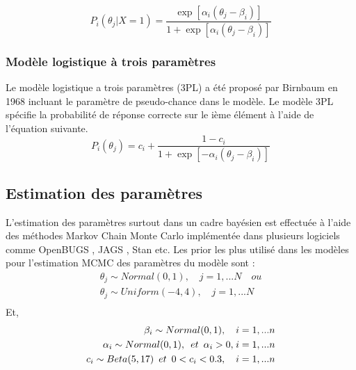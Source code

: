\begin{equation}
    P_{i}(\theta_{j} | X=1) = \frac{\exp \left[ \alpha_{i}(\theta_{j}-\beta_{i}) \right]  }{1+ \exp \left[ \alpha_{i}(\theta_{j}-\beta_{i}) \right]  } 
	\label{2pl_model_equation}
\end{equation}

\subsubsection{Modèle logistique à trois paramètres}
Le modèle logistique a trois paramètres (3PL) a été proposé par Birnbaum en 1968 incluant le paramètre de pseudo-chance dans le modèle. Le modèle 3PL spécifie la probabilité de réponse correcte sur le ième élément à l'aide de l'équation suivante. \\

\begin{equation}
    P_{i}(\theta_{j}) = c_{i} +  \frac{1 - c_{i}}{1+ \exp \left[ -\alpha_{i}(\theta_{j}-\beta_{i}) \right]  } 
	\label{3pl_model_equation}
\end{equation}

\subsection{Estimation des paramètres}
L'estimation des paramètres surtout dans un cadre bayésien est effectuée à l’aide des méthodes Markov Chain Monte Carlo implémentée dans plusieurs logiciels comme OpenBUGS \cite{lunn2009bugs}, JAGS \cite{plummer2003jags}, Stan \cite{stan} etc. Les prior les plus utilisé dans les modèles pour l'estimation MCMC des paramètres du modèle sont : \\

\begin{equation}
	\begin{split}
		\theta_{j} \sim Normal(0,1), \hspace{1em} j = 1,...N \hspace{1em} ou \\
		\theta_{j} \sim Uniform(-4,4), \hspace{1em} j = 1,...N  \\
	\end{split}	
	\label{prior_subjects}
\end{equation}
\noindent Et,
\begin{equation}
	\begin{split}
		\beta_{i} \sim Normal(0,1), \hspace{1em} i = 1,...n \\
		\alpha_{i} \sim Normal(0,1), \hspace{0.5em} et \hspace{0.5em} \alpha_{i} > 0 , \hspace{0.1em} i = 1,...n \\
		c_{i} \sim Beta(5,17) \hspace{0.5em}  et \hspace{0.5em} 0<c_{i}<0.3, \hspace{1em} i = 1,...n 
	\end{split}	
	\label{prior_items}
\end{equation}

